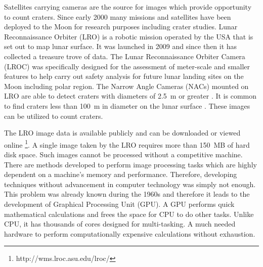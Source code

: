\documentclass[11pt]{article}
\begin{document}
Satellites carrying cameras are the source for images which provide opportunity to count craters. Since early 2000 many missions and satellites have been deployed to the Moon for research purposes including crater studies. Lunar Reconnaissance Orbiter (LRO) is a robotic mission operated by the USA that is set out to map lunar surface. It was launched in 2009 and since then it has collected a treasure trove of data. The Lunar Reconnaissance Orbiter Camera (LROC) was specifically designed for the assessment of meter-scale and smaller features to help carry out safety analysis for future lunar landing sites on the Moon including polar region. The Narrow Angle Cameras (NACs) mounted on LRO are able to detect craters with diameters of \SI{2.5}{\metre} or greater \cite{robinson2010lunar}. It is common to find craters less than \SI{100}{\metre} in diameter on the lunar surface \cite{robinson2010lunar}. These images can be utilized to count craters.

The LRO image data is available publicly and can be downloaded or viewed online \footnote{http://wms.lroc.asu.edu/lroc/}. A single image taken by the LRO requires more than \SI{150}{MB} of hard disk space. Such images cannot be processed without a competitive machine. There are methods developed to perform image processing tasks which are highly dependent on a machine's memory and performance. Therefore, developing techniques without advancement in computer technology was simply not enough. This problem was already known during the 1960s and therefore it leads to the development of Graphical Processing Unit (GPU). A GPU performs quick mathematical calculations and frees the space for CPU to do other tasks. Unlike CPU, it has thousands of cores designed for multi-tasking. A much needed hardware to perform computationally expensive calculations without exhaustion. 
\end{document}
